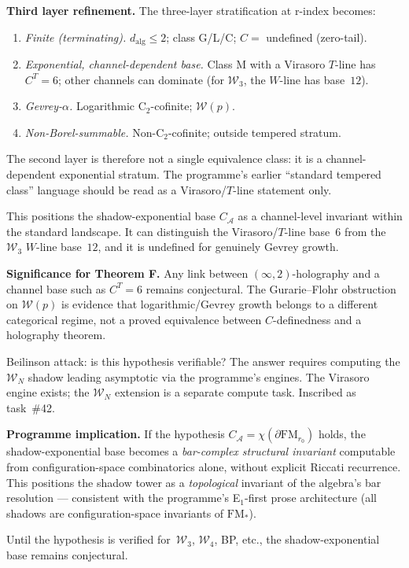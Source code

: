 \documentclass[11pt]{article}
\newcommand{\cA}{\mathcal{A}}
\newcommand{\cW}{\mathcal{W}}
\begin{document}
\textbf{Third layer refinement.} The three-layer stratification at
r-index becomes:
\begin{enumerate}
  \item \emph{Finite (terminating).} $d_{\mathrm{alg}} \le 2$; class
        G/L/C; $C = $ undefined (zero-tail).
  \item \emph{Exponential, channel-dependent base.} Class M with a
        Virasoro $T$-line has $C^T=6$; other channels can dominate
        (for $\cW_3$, the $W$-line has base~$12$).
  \item \emph{Gevrey-$\alpha$.} Logarithmic C$_2$-cofinite; $\cW(p)$.
  \item \emph{Non-Borel-summable.} Non-C$_2$-cofinite; outside
        tempered stratum.
\end{enumerate}
The second layer is therefore not a single equivalence class:
it is a channel-dependent exponential stratum.  The
programme's earlier ``standard tempered class'' language should be
read as a Virasoro/$T$-line statement only.

This positions the shadow-exponential base $C_\cA$ as a
channel-level invariant within the standard landscape.  It can
distinguish the Virasoro/$T$-line base~$6$ from the $\cW_3$
$W$-line base~$12$, and it is undefined for genuinely Gevrey
growth.

\textbf{Significance for Theorem F.} Any link between
$(\infty,2)$-holography and a channel base such as $C^T=6$
remains conjectural.  The Gurarie--Flohr obstruction on
$\cW(p)$ is evidence that logarithmic/Gevrey growth belongs to a
different categorical regime, not a proved equivalence between
$C$-definedness and a holography theorem.

Beilinson attack: is this hypothesis verifiable? The answer requires
computing the $\cW_N$ shadow leading asymptotic via the programme's
engines. The Virasoro engine exists; the $\cW_N$ extension is a
separate compute task. Inscribed as task~\#42.

\textbf{Programme implication.} If the hypothesis
$C_{\cA} = \chi(\partial \mathrm{FM}_{r_0})$ holds, the
shadow-exponential base becomes a \emph{bar-complex structural
invariant} computable from configuration-space combinatorics alone,
without explicit Riccati recurrence. This positions the shadow
tower as a \emph{topological} invariant of the algebra's bar
resolution — consistent with the programme's E$_1$-first prose
architecture (all shadows are configuration-space invariants of
$\mathrm{FM}_*$).

Until the hypothesis is verified for~$\cW_3$, $\cW_4$, BP, etc.,
the shadow-exponential base remains conjectural.
\end{document}

